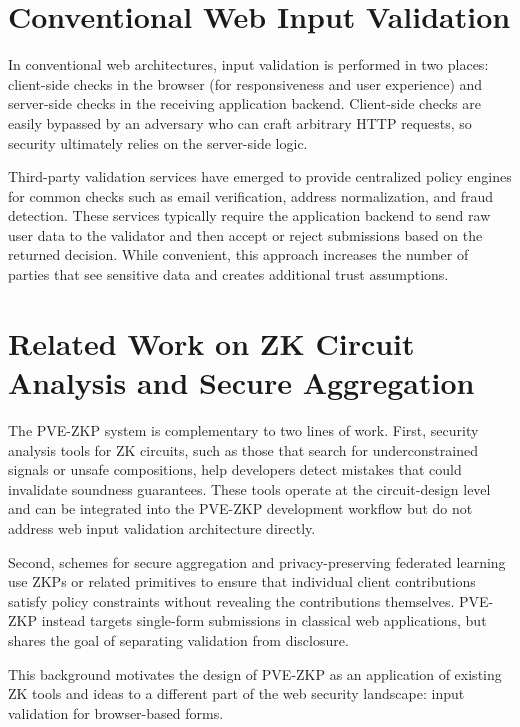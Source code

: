 \section{Conventional Web Input Validation}

In conventional web architectures, input validation is performed in two places:
client-side checks in the browser (for responsiveness and user experience) and
server-side checks in the receiving application backend. Client-side checks are
easily bypassed by an adversary who can craft arbitrary HTTP requests, so
security ultimately relies on the server-side logic.

Third-party validation services have emerged to provide centralized policy
engines for common checks such as email verification, address normalization, and
fraud detection. These services typically require the application backend to
send raw user data to the validator and then accept or reject submissions based
on the returned decision. While convenient, this approach increases the number
of parties that see sensitive data and creates additional trust assumptions.

\section{Related Work on ZK Circuit Analysis and Secure Aggregation}

The PVE-ZKP system is complementary to two lines of work. First, security
analysis tools for ZK circuits, such as those that search for underconstrained
signals or unsafe compositions, help developers detect mistakes that could
invalidate soundness guarantees. These tools operate at the circuit-design
level and can be integrated into the PVE-ZKP development workflow but do not
address web input validation architecture directly.

Second, schemes for secure aggregation and privacy-preserving federated
learning use ZKPs or related primitives to ensure that individual client
contributions satisfy policy constraints without revealing the contributions
themselves. PVE-ZKP instead targets single-form submissions in classical web
applications, but shares the goal of separating validation from disclosure.

This background motivates the design of PVE-ZKP as an application of existing
ZK tools and ideas to a different part of the web security landscape: input
validation for browser-based forms.
